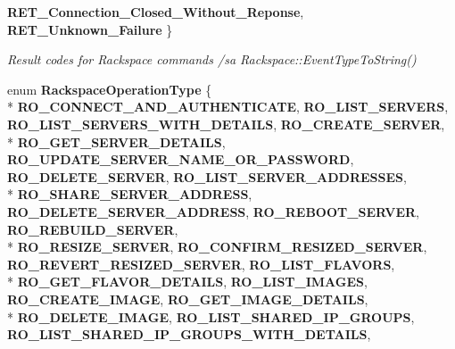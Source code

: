 \begin{DoxyCompactItemize}
{\bfseries R\-E\-T\-\_\-\-Connection\-\_\-\-Closed\-\_\-\-Without\-\_\-\-Reponse}, 
{\bfseries R\-E\-T\-\_\-\-Unknown\-\_\-\-Failure}
 \}
\begin{DoxyCompactList}\small\item\em Result codes for Rackspace commands /sa Rackspace\-::\-Event\-Type\-To\-String() \end{DoxyCompactList}\item 
enum {\bfseries Rackspace\-Operation\-Type} \{ \\*
{\bfseries R\-O\-\_\-\-C\-O\-N\-N\-E\-C\-T\-\_\-\-A\-N\-D\-\_\-\-A\-U\-T\-H\-E\-N\-T\-I\-C\-A\-T\-E}, 
{\bfseries R\-O\-\_\-\-L\-I\-S\-T\-\_\-\-S\-E\-R\-V\-E\-R\-S}, 
{\bfseries R\-O\-\_\-\-L\-I\-S\-T\-\_\-\-S\-E\-R\-V\-E\-R\-S\-\_\-\-W\-I\-T\-H\-\_\-\-D\-E\-T\-A\-I\-L\-S}, 
{\bfseries R\-O\-\_\-\-C\-R\-E\-A\-T\-E\-\_\-\-S\-E\-R\-V\-E\-R}, 
\\*
{\bfseries R\-O\-\_\-\-G\-E\-T\-\_\-\-S\-E\-R\-V\-E\-R\-\_\-\-D\-E\-T\-A\-I\-L\-S}, 
{\bfseries R\-O\-\_\-\-U\-P\-D\-A\-T\-E\-\_\-\-S\-E\-R\-V\-E\-R\-\_\-\-N\-A\-M\-E\-\_\-\-O\-R\-\_\-\-P\-A\-S\-S\-W\-O\-R\-D}, 
{\bfseries R\-O\-\_\-\-D\-E\-L\-E\-T\-E\-\_\-\-S\-E\-R\-V\-E\-R}, 
{\bfseries R\-O\-\_\-\-L\-I\-S\-T\-\_\-\-S\-E\-R\-V\-E\-R\-\_\-\-A\-D\-D\-R\-E\-S\-S\-E\-S}, 
\\*
{\bfseries R\-O\-\_\-\-S\-H\-A\-R\-E\-\_\-\-S\-E\-R\-V\-E\-R\-\_\-\-A\-D\-D\-R\-E\-S\-S}, 
{\bfseries R\-O\-\_\-\-D\-E\-L\-E\-T\-E\-\_\-\-S\-E\-R\-V\-E\-R\-\_\-\-A\-D\-D\-R\-E\-S\-S}, 
{\bfseries R\-O\-\_\-\-R\-E\-B\-O\-O\-T\-\_\-\-S\-E\-R\-V\-E\-R}, 
{\bfseries R\-O\-\_\-\-R\-E\-B\-U\-I\-L\-D\-\_\-\-S\-E\-R\-V\-E\-R}, 
\\*
{\bfseries R\-O\-\_\-\-R\-E\-S\-I\-Z\-E\-\_\-\-S\-E\-R\-V\-E\-R}, 
{\bfseries R\-O\-\_\-\-C\-O\-N\-F\-I\-R\-M\-\_\-\-R\-E\-S\-I\-Z\-E\-D\-\_\-\-S\-E\-R\-V\-E\-R}, 
{\bfseries R\-O\-\_\-\-R\-E\-V\-E\-R\-T\-\_\-\-R\-E\-S\-I\-Z\-E\-D\-\_\-\-S\-E\-R\-V\-E\-R}, 
{\bfseries R\-O\-\_\-\-L\-I\-S\-T\-\_\-\-F\-L\-A\-V\-O\-R\-S}, 
\\*
{\bfseries R\-O\-\_\-\-G\-E\-T\-\_\-\-F\-L\-A\-V\-O\-R\-\_\-\-D\-E\-T\-A\-I\-L\-S}, 
{\bfseries R\-O\-\_\-\-L\-I\-S\-T\-\_\-\-I\-M\-A\-G\-E\-S}, 
{\bfseries R\-O\-\_\-\-C\-R\-E\-A\-T\-E\-\_\-\-I\-M\-A\-G\-E}, 
{\bfseries R\-O\-\_\-\-G\-E\-T\-\_\-\-I\-M\-A\-G\-E\-\_\-\-D\-E\-T\-A\-I\-L\-S}, 
\\*
{\bfseries R\-O\-\_\-\-D\-E\-L\-E\-T\-E\-\_\-\-I\-M\-A\-G\-E}, 
{\bfseries R\-O\-\_\-\-L\-I\-S\-T\-\_\-\-S\-H\-A\-R\-E\-D\-\_\-\-I\-P\-\_\-\-G\-R\-O\-U\-P\-S}, 
{\bfseries R\-O\-\_\-\-L\-I\-S\-T\-\_\-\-S\-H\-A\-R\-E\-D\-\_\-\-I\-P\-\_\-\-G\-R\-O\-U\-P\-S\-\_\-\-W\-I\-T\-H\-\_\-\-D\-E\-T\-A\-I\-L\-S}, 

\end{DoxyCompactItemize}
